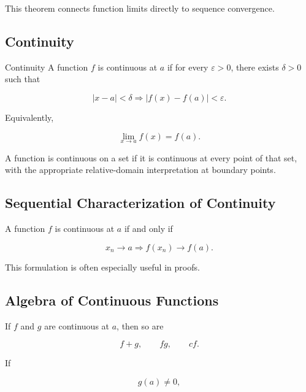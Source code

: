 This theorem connects function limits directly to sequence convergence.

\subsection{Continuity}
\label{subsec:continuity-real-analysis}

\begin{definitionbox}{Continuity}
A function \(f\) is continuous at \(a\) if for every \(\varepsilon>0\),
there exists \(\delta>0\) such that

\[
\boxed{
|x-a|<\delta
\Longrightarrow
|f(x)-f(a)|<\varepsilon.
}
\]
\end{definitionbox}

Equivalently,

\[
\boxed{
\lim_{x\to a}f(x)=f(a).
}
\]

A function is continuous on a set if it is continuous at every point of
that set, with the appropriate relative-domain interpretation at boundary
points.

\subsection{Sequential Characterization of Continuity}
\label{subsec:sequential-continuity}

A function \(f\) is continuous at \(a\) if and only if

\[
\boxed{
x_n\to a
\Longrightarrow
f(x_n)\to f(a).
}
\]

This formulation is often especially useful in proofs.

\subsection{Algebra of Continuous Functions}
\label{subsec:algebra-continuous-functions}

If \(f\) and \(g\) are continuous at \(a\), then so are

\[
\boxed{
f+g,
\qquad
fg,
\qquad
cf.
}
\]

If

\[
g(a)\neq0,
\]


